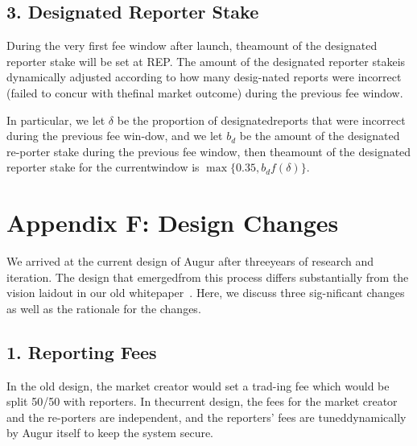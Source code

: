 \documentclass[12pt,floatfix,reprint,nofootinbib,amsmath,amssymb,epsfig,pre,floats,letterpaper,groupedaffiliation]{revtex4-1}
\theoremstyle{definition}
\theoremstyle{definition}
\begin{document}
\subsection*{3. Designated Reporter Stake}

During the very first fee window after launch, the\linebreak amount of the designated reporter stake will be set at REP. The amount of the designated reporter stake\linebreak is dynamically adjusted according to how many desig-\linebreak nated reports were incorrect (failed to concur with the\linebreak final market outcome) during the previous fee window.

In particular, we let $\delta$ be the proportion of designated\linebreak reports that were incorrect during the previous fee win-\linebreak dow, and we let $b_d$ be the amount of the designated re-\linebreak porter stake during the previous fee window, then the\linebreak amount of the designated reporter stake for the current\linebreak window is $\max \{0.35, b_df(\delta)\}$.

\section*{Appendix F: Design Changes}

We arrived at the current design of Augur after three\linebreak years of research and iteration. The design that emerged\linebreak from this process differs substantially from the vision laid\linebreak out in our old whitepaper~\cite{Peterson_2014}. Here, we discuss three sig-\linebreak nificant changes as well as the rationale for the changes.

\subsection*{1. Reporting Fees}

In the old design, the market creator would set a trad-\linebreak ing fee which would be split 50/50 with reporters. In the\linebreak current design, the fees for the market creator and the re-\linebreak porters are independent, and the reporters' fees are tuned\linebreak dynamically by Augur itself to keep the system secure.
\end{document}

